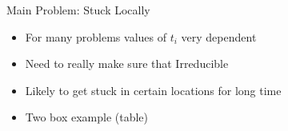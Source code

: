 \documentclass[11pt]{beamer}
\begin{document}
	\begin{frame}{Main Problem: Stuck Locally}
		\begin{itemize}
			\item For many problems values of $t_i$ very dependent
			\item Need to really make sure that Irreducible
			\item Likely to get stuck in certain locations for long time
			\item Two box example (table)
		\end{itemize}
	\end{frame}
	
\end{document}
